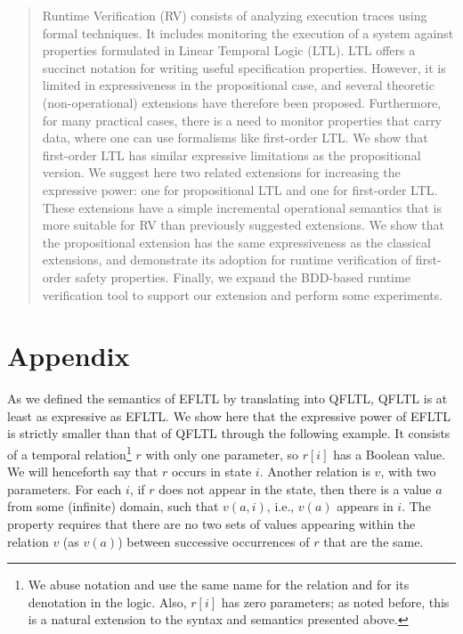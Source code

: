 \documentclass{llncs}
\begin{document}
\begin{abstract}

Runtime Verification (RV) consists of analyzing execution 
traces using formal techniques. 
It includes monitoring the 
execution of a system against properties formulated in 
Linear Temporal Logic (LTL). 
LTL offers a succinct notation for writing useful 
specification properties. However, it is limited in 
expressiveness in the propositional case, and several 
theoretic (non-operational) extensions have therefore been proposed. Furthermore, for many practical cases, there is a need to monitor properties 
that carry data, where one can use formalisms like 
first-order LTL. We show that 
first-order LTL has similar expressive
limitations as the propositional version. We suggest here 
two related extensions for increasing the expressive power: 
one for propositional LTL and one for 
first-order LTL. These extensions have a simple incremental operational 
semantics that is more suitable for RV than previously 
suggested extensions. We show that the 
propositional extension has the same expressiveness as the 
classical extensions, and demonstrate its
adoption for runtime verification of first-order safety 
properties. Finally, we expand the BDD-based runtime verification 
tool \dejavu{}  to support our extension and perform some 
experiments.

\end{abstract}









\newpage
\appendix

\section{Appendix}


As we defined the semantics of
EFLTL by translating into QFLTL, QFLTL is at least as
expressive as EFLTL. We show here that 
the expressive power of EFLTL is strictly smaller than that of
QFLTL through the following example. It consists of
a temporal relation\footnote{We abuse notation and
use the same name for the relation and for its
denotation in the logic. Also, $r [ i ]$ has zero
parameters; as noted before, this is a natural extension to the syntax and semantics presented above.} $r$ with only one parameter, so $r [ i ]$
has a Boolean value. We will henceforth say that $r$ occurs
in state $i$. Another relation is $v$, with
two parameters. For each $i$, if $r$ does not appear in the
state, 
then there is a value $a$ from some (infinite) domain,
such that $v ( a, i )$, 
i.e., $v(a)$ appears in $i$.
The property requires that there are no two sets of values appearing within the relation $v$ (as $v(a)$) between successive occurrences of $r$ that are the same.
\end{document}
